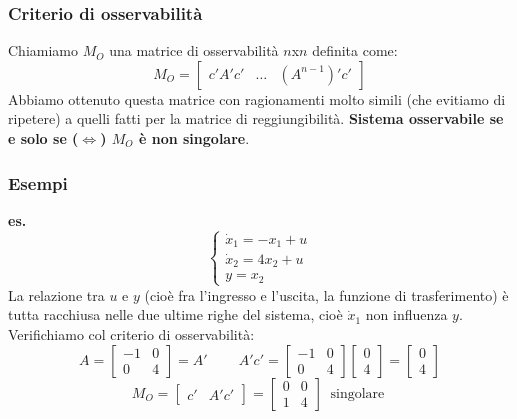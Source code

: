 \subsubsection{Criterio di osservabilità}
Chiamiamo $M_O$ una matrice di osservabilità $n$x$n$ definita come:
\[
    M_O = \left[\begin{matrix}
        c'A'c' & \dots & (A^{n-1})' c'
    \end{matrix}\right]
\]
Abbiamo ottenuto questa matrice con ragionamenti molto simili (che evitiamo di ripetere) a quelli fatti per la matrice di reggiungibilità.\newline
\newline
\textbf{Sistema osservabile se e solo se ($\Leftrightarrow$) $M_O$ è non singolare}.
\subsubsection{Esempi}
\textbf{es.} 
\[
    \begin{cases}
        \dot{x}_1 = -x_1 + u \\
        \dot{x}_2 = 4x_2 +u\\
        y=x_2
    \end{cases}
\]
La relazione tra $u$ e $y$ (cioè fra l'ingresso e l'uscita, la funzione di trasferimento) è tutta racchiusa nelle due ultime righe del sistema, cioè $\dot{x}_1$ non influenza $y$.\newline
Verifichiamo col criterio di osservabilità:\newline
\[
    A= \left[\begin{matrix}
        -1 & 0 \\ 0 & 4
    \end{matrix}\right] = A' \;\;\;\;\;\;\;\; A'c' = \left[\begin{matrix}
        -1 &0 \\ 0 & 4
    \end{matrix}\right] \left[\begin{matrix}
        0 \\ 4
    \end{matrix}\right] = \left[\begin{matrix}
        0 \\ 4
    \end{matrix}\right]
\]
\[
    M_O = \left[\begin{matrix}
        c' & A' c'
    \end{matrix}\right] = \left[\begin{matrix}
        0 & 0 \\ 1 & 4
    \end{matrix}\right] \;\;\text{singolare}\;
\]
